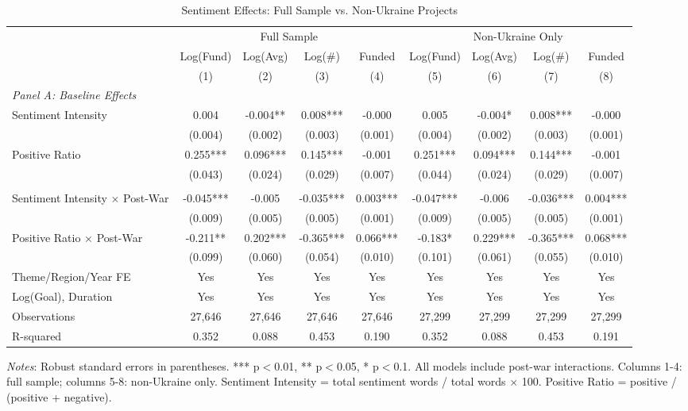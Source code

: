\begin{table}[htbp]
\centering
\caption{Sentiment Effects: Full Sample vs. Non-Ukraine Projects}
\label{tab:sentiment}
\begin{threeparttable}
\small
\begin{tabular}{lcccccccc}
\toprule
& \multicolumn{4}{c}{Full Sample} & \multicolumn{4}{c}{Non-Ukraine Only} \\
\cmidrule(lr){2-5} \cmidrule(lr){6-9}
& Log(Fund) & Log(Avg) & Log(\#) & Funded & Log(Fund) & Log(Avg) & Log(\#) & Funded \\
& (1) & (2) & (3) & (4) & (5) & (6) & (7) & (8) \\
\midrule
\multicolumn{9}{l}{\textit{Panel A: Baseline Effects}} \\
Sentiment Intensity & 0.004 & -0.004** & 0.008*** & -0.000 & 0.005 & -0.004* & 0.008*** & -0.000 \\
& (0.004) & (0.002) & (0.003) & (0.001) & (0.004) & (0.002) & (0.003) & (0.001) \\
Positive Ratio & 0.255*** & 0.096*** & 0.145*** & -0.001 & 0.251*** & 0.094*** & 0.144*** & -0.001 \\
& (0.043) & (0.024) & (0.029) & (0.007) & (0.044) & (0.024) & (0.029) & (0.007) \\
\addlinespace
\multicolumn{9}{l}{\textit{Panel B: Post-War Interactions}} \\
Sentiment Intensity $\times$ Post-War & -0.045*** & -0.005 & -0.035*** & 0.003*** & -0.047*** & -0.006 & -0.036*** & 0.004*** \\
& (0.009) & (0.005) & (0.005) & (0.001) & (0.009) & (0.005) & (0.005) & (0.001) \\
Positive Ratio $\times$ Post-War & -0.211** & 0.202*** & -0.365*** & 0.066*** & -0.183* & 0.229*** & -0.365*** & 0.068*** \\
& (0.099) & (0.060) & (0.054) & (0.010) & (0.101) & (0.061) & (0.055) & (0.010) \\
\midrule
Theme/Region/Year FE & Yes & Yes & Yes & Yes & Yes & Yes & Yes & Yes \\
Log(Goal), Duration & Yes & Yes & Yes & Yes & Yes & Yes & Yes & Yes \\
\midrule
Observations & 27,646 & 27,646 & 27,646 & 27,646 & 27,299 & 27,299 & 27,299 & 27,299 \\
R-squared & 0.352 & 0.088 & 0.453 & 0.190 & 0.352 & 0.088 & 0.453 & 0.191 \\
\bottomrule
\end{tabular}
\begin{tablenotes}
\small
\item \textit{Notes}: Robust standard errors in parentheses. *** p$<$0.01, ** p$<$0.05, * p$<$0.1. All models include post-war interactions. Columns 1-4: full sample; columns 5-8: non-Ukraine only. Sentiment Intensity = total sentiment words / total words $\times$ 100. Positive Ratio = positive / (positive + negative).
\end{tablenotes}
\end{threeparttable}
\end{table}

